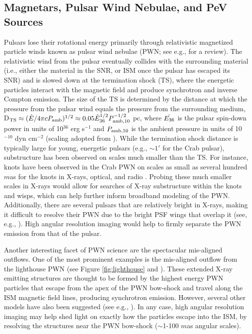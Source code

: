 \documentclass{article}
\begin{document}
\subsection{Magnetars, Pulsar Wind Nebulae, and PeV Sources} 
\label{sec:mag_psr_PeV}
Pulsars lose their rotational energy primarily through relativistic magnetized particle winds known as pulsar wind nebulae (PWN; see e.g., \cite{2017hsn..book.2159S} for a review). The relativistic wind from the pulsar eventually collides with the surrounding material (i.e., either the material in the SNR, or ISM once the pulsar has escaped its SNR) and is slowed down at the termination shock (TS), where the energetic particles interact with the magnetic field and produce synchrotron and inverse Compton emission. The size of the TS is determined by the distance at which the pressure from the pulsar wind equals the pressure from the surrounding medium, D$_{\rm TS}\approx(\dot{E}/4\pi c P_{\rm amb})^{1/2}\approx0.05\dot{E}_{\rm{36}}^{1/2}P^{-1/2}_{\rm amb,10}$ pc, where $\dot{E_{\rm{36}}}$ is the pulsar spin-down power in units of 10$^{36}$ erg s$^{-1}$ and $P_{\rm amb,10}$ is the ambient pressure in units of 10$^{-10}$ dyn cm$^{-2}$ (scaling adopted from \cite{2008AIPC..983..171K}). While the termination shock distance is typically large for young, energetic pulsars (e.g., $\sim1'$ for the Crab pulsar), substructure has been observed on scales much smaller than the TS. For instance, knots have been observed in the Crab PWN on scales as small as several hundred $m$as for the knots in X-rays, optical, and radio \cite{2002ApJ...577L..49H,2011Sci...331..736T,2011A&A...533A..10L,2015ApJ...811...24R}. Probing these much smaller scales in X-rays would allow for searches of X-ray substructure within the knots and wisps, which can help further inform broadband modeling of the PWN. Additionally, there are several pulsars that are relatively bright in X-rays, making it difficult to resolve their PWN due to the bright PSF wings that overlap it (see, e.g., \cite{2009ApJ...690..891K,2024ApJ...968...67G}). High angular resolution imaging would help to firmly separate the PWN emission from that of the pulsar.

Another interesting facet of PWN science are the spectacular mis-aligned outflows. One of the most prominent examples is the mis-aligned outflow from the lighthouse PWN (see Figure \ref{fig:lighthouse} and \cite{2023ApJ...950..177K}). These extended X-ray emitting structures are thought to be formed by the highest energy PWN particles that escape from the apex of the PWN bow-shock and travel along the ISM magnetic field lines, producing synchrotron emission. However, several other models have also been suggested (see e.g., \cite{2023Univ....9..402O,2024ApJ...976....4D}). In any case, high angular resolution imaging may help shed light on exactly how the particles escape into the ISM, by resolving the structures near the PWN bow-shock ($\sim$1-100 $m$as angular scales).
\end{document}
